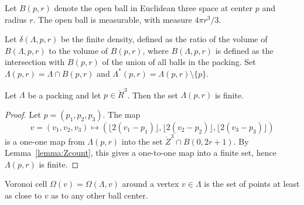 



  Let $B(p,r)$ denote the open ball in
Euclidean three space at center $p$ and radius $r$.  The open ball
is measurable, with measure $4\pi r^3/3$.


Let $\delta(\Lambda,p,r)$ be the finite density, defined as the
ratio of the volume of $B(\Lambda,p,r)$ to the volume of $B(p,r)$,
where $B(\Lambda,p,r)$ is defined as the intersection with
$B(p,r)$ of the union of all balls in the packing. Set
$\Lambda(p,r) = \Lambda \cap
B(p,r)$ and $\Lambda^*(p,r) = \Lambda(p,r)\setminus \{p\}$.

\begin{lemma}
\label{lemma:Lambda-finite}
Let $\Lambda$ be a packing and let $p\in\ring{R}^3$.
Then the set $\Lambda(p,r)$ is finite.
\end{lemma}

\begin{proof}  Let $p = (p_1,p_2,p_3)$. The map
$$v=(v_1,v_2,v_3)\mapsto (\lfloor 2(v_1-p_1)
\rfloor, \lfloor 2(v_2-p_2) \rfloor, \lfloor 2(v_3-p_3) \rfloor)$$
is a one-one map from $\Lambda(p,r)$ into the set $\ring{Z}^3\cap B(0,2r + 1)$.  By Lemma~\ref{lemma:Zcount}, this gives a one-to-one map  into a finite set, hence $\Lambda(p,r)$ is finite.
\end{proof}


\begin{definition}\label{def:voronoi}
 Voronoi cell
$\Omega(v)=\Omega(\Lambda,v)$
 around a
vertex $v\in \Lambda$ is the set of points at least as close to $v$ as to
any other ball center. 
\end{definition}

